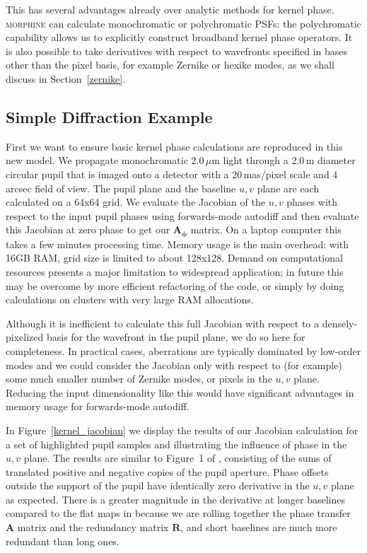 \documentclass[modern]{aastex63}
\begin{document}
This has several advantages already over analytic methods for kernel phase. \textsc{morphine} can calculate monochromatic or polychromatic PSFs: the polychromatic capability allows us to explicitly construct broadband kernel phase operators. It is also possible to take derivatives with respect to wavefronts specified in bases other than the pixel basis, for example Zernike or hexike modes, as we shall discuss in Section~\ref{zernike}.

\subsection{Simple Diffraction Example}
\label{sec:simple}

First we want to ensure basic kernel phase calculations are reproduced in this new model. We propagate monochromatic 2.0\,$\mu$m light through a 2.0\,m diameter circular pupil that is imaged onto a detector with a 20\,mas/pixel scale and 4\,arcsec field of view. The pupil plane and the baseline $u,v$ plane are each calculated on a 64x64 grid. We evaluate the Jacobian of the $u,v$ phases with respect to the input pupil phases using forwards-mode autodiff and then evaluate this Jacobian at zero phase to get our $\mathbf{A_\phi}$ matrix. On a laptop computer this takes a few minutes processing time. Memory usage is the main overhead: with 16GB RAM, grid size is limited to about 128x128. Demand on computational resources presents a major limitation to widespread application; in future this may be overcome by more efficient refactoring of the code, or simply by doing calculations on clusters with very large RAM allocations.

Although it is inefficient to calculate this full Jacobian with respect to a densely-pixelized basis for the wavefront in the pupil plane, we do so here for completeness. In practical cases, aberrations are typically dominated by low-order modes and we could consider the Jacobian only with respect to (for example) some much smaller number of Zernike modes, or pixels in the $u,v$ plane. Reducing the input dimensionality like this would have significant advantages in memory usage for forwards-mode autodiff.

In Figure~\ref{kernel_jacobian} we display the results of our Jacobian calculation for a set of highlighted pupil samples and illustrating the influence of phase in the $u,v$ plane. 
The results are similar to Figure~1 of \citet{martinache10}, consisting of the sums of translated positive and negative copies of the pupil aperture. Phase offsets outside the support of the pupil have identically zero derivative in the $u,v$ plane as expected. There is a greater magnitude in the derivative at longer baselines compared to the flat maps in \citet{martinache10} because we are rolling together the phase transfer $\mathbf{A}$ matrix and the redundancy matrix $\mathbf{R}$, and short baselines are much more redundant than long ones.
\end{document}
